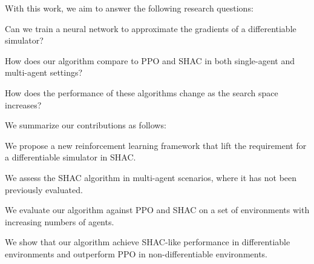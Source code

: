 With this work, we aim to answer the following research questions:
\begin{compactitem}
    \item {} Can we train a neural network to approximate the gradients of a differentiable simulator?
    \item {} How does our algorithm compare to PPO and SHAC in both single-agent and multi-agent settings?
    \item {} How does the performance of these algorithms change as the search space increases?
\end{compactitem}

We summarize our contributions as follows:
\begin{compactitem}
    \item We propose a new reinforcement learning framework that lift the requirement for a differentiable simulator in SHAC.
    \item We assess the SHAC algorithm in multi-agent scenarios, where it has not been previously evaluated.
    \item We evaluate our algorithm against PPO and SHAC on a set of environments with increasing numbers of agents.
    \item We show that our algorithm achieve SHAC-like performance in differentiable environments and outperform PPO in non-differentiable environments.
\end{compactitem}
